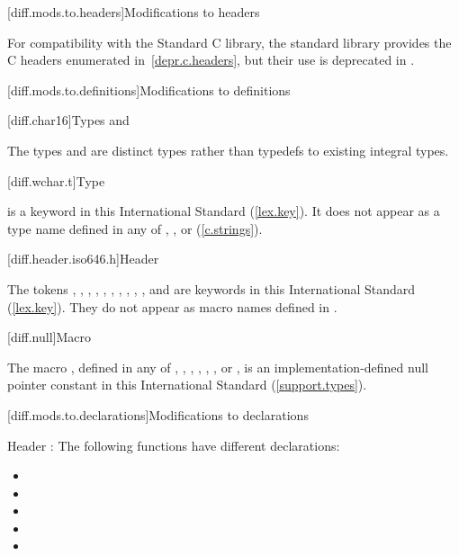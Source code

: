 [diff.mods.to.headers]{Modifications to headers}

\pnum
For compatibility with the Standard C library,
%
the \Cpp standard library provides the C headers enumerated
in~\ref{depr.c.headers}, but their use is deprecated in \Cpp.

[diff.mods.to.definitions]{Modifications to definitions}

[diff.char16]{Types  and }

\pnum
The types  and 
are distinct types rather than typedefs to existing integral types.

[diff.wchar.t]{Type }

\pnum
{}
is a keyword in this International Standard (\ref{lex.key}).
It does not appear as a type name defined in any of
,
%
,
%
or
%
(\ref{c.strings}).

[diff.header.iso646.h]{Header }
%

\pnum
The tokens
,
,
,
,
,
,
,
,
,
,
and
are keywords in this International
Standard (\ref{lex.key}).
They do not appear as macro names defined in
.
%

[diff.null]{Macro }

\pnum
The macro
,
defined in any of
%
,
%
,
%
,
%
,
%
,
%
,
or
,
%
is an implementation-defined \Cpp null pointer constant in
%
this International Standard (\ref{support.types}).

[diff.mods.to.declarations]{Modifications to declarations}

\pnum
Header
:
%
The following functions have different declarations:
\begin{itemize}
\item
{}
\item
{}
\item
{}
\item
{}
\item
{}
\end{itemize}

